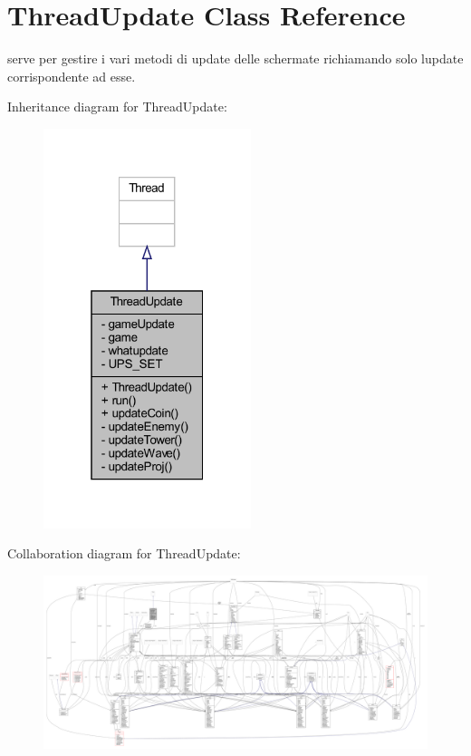 \hypertarget{classprogetto_1_1_thread_update}{}\section{Thread\+Update Class Reference}
\label{classprogetto_1_1_thread_update}


serve per gestire i vari metodi di update delle schermate richiamando solo l\textquotesingle{}update corrispondente ad esse.  




Inheritance diagram for Thread\+Update\+:\nopagebreak
\begin{figure}[H]
\begin{center}
\leavevmode
\includegraphics[width=172pt]{classprogetto_1_1_thread_update__inherit__graph}
\end{center}
\end{figure}


Collaboration diagram for Thread\+Update\+:
\nopagebreak
\begin{figure}[H]
\begin{center}
\leavevmode
\includegraphics[width=350pt]{classprogetto_1_1_thread_update__coll__graph}
\end{center}
\end{figure}
